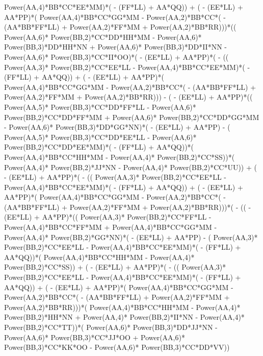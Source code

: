 \documentclass[10pt]{article} %
\begin{document}
Power(AA,4)*BB*CC*EE*MM)*( - (FF*LL) + AA*QQ)) + ( - (EE*LL) + AA*PP)*( Power(AA,4)*BB*CC*GG*MM -  Power(AA,2)*BB*CC*( - (AA*BB*FF*LL) +  Power(AA,2)*FF*MM +  Power(AA,2)*BB*RR)))*(( Power(AA,6)* Power(BB,2)*CC*DD*HH*MM -  Power(AA,6)* Power(BB,3)*DD*HH*NN +  Power(AA,6)* Power(BB,3)*DD*II*NN -  Power(AA,6)* Power(BB,3)*CC*II*OO)*( - (EE*LL) + AA*PP)*( - (( Power(AA,3)* Power(BB,2)*CC*EE*LL -  Power(AA,4)*BB*CC*EE*MM)*( - (FF*LL) + AA*QQ)) + ( - (EE*LL) + AA*PP)*( Power(AA,4)*BB*CC*GG*MM -  Power(AA,2)*BB*CC*( - (AA*BB*FF*LL) +  Power(AA,2)*FF*MM +  Power(AA,2)*BB*RR))) - ( - (EE*LL) + AA*PP)*(( Power(AA,5)* Power(BB,3)*CC*DD*FF*LL -  Power(AA,6)* Power(BB,2)*CC*DD*FF*MM +  Power(AA,6)* Power(BB,2)*CC*DD*GG*MM -  Power(AA,6)* Power(BB,3)*DD*GG*NN)*( - (EE*LL) + AA*PP) - ( Power(AA,5)* Power(BB,3)*CC*DD*EE*LL -  Power(AA,6)* Power(BB,2)*CC*DD*EE*MM)*( - (FF*LL) + AA*QQ))*( Power(AA,4)*BB*CC*HH*MM -  Power(AA,4)* Power(BB,2)*CC*SS))*( Power(AA,4)* Power(BB,2)*JJ*NN -  Power(AA,4)* Power(BB,2)*CC*UU)) + ( - (EE*LL) + AA*PP)*( - (( Power(AA,3)* Power(BB,2)*CC*EE*LL -  Power(AA,4)*BB*CC*EE*MM)*( - (FF*LL) + AA*QQ)) + ( - (EE*LL) + AA*PP)*( Power(AA,4)*BB*CC*GG*MM -  Power(AA,2)*BB*CC*( - (AA*BB*FF*LL) +  Power(AA,2)*FF*MM +  Power(AA,2)*BB*RR)))*( - (( - (EE*LL) + AA*PP)*(( Power(AA,3)* Power(BB,2)*CC*FF*LL -  Power(AA,4)*BB*CC*FF*MM +  Power(AA,4)*BB*CC*GG*MM -  Power(AA,4)* Power(BB,2)*GG*NN)*( - (EE*LL) + AA*PP) - ( Power(AA,3)* Power(BB,2)*CC*EE*LL -  Power(AA,4)*BB*CC*EE*MM)*( - (FF*LL) + AA*QQ))*( Power(AA,4)*BB*CC*HH*MM -  Power(AA,4)* Power(BB,2)*CC*SS)) + ( - (EE*LL) + AA*PP)*( - (( Power(AA,3)* Power(BB,2)*CC*EE*LL -  Power(AA,4)*BB*CC*EE*MM)*( - (FF*LL) + AA*QQ)) + ( - (EE*LL) + AA*PP)*( Power(AA,4)*BB*CC*GG*MM -  Power(AA,2)*BB*CC*( - (AA*BB*FF*LL) +  Power(AA,2)*FF*MM +  Power(AA,2)*BB*RR)))*( Power(AA,4)*BB*CC*HH*MM -  Power(AA,4)* Power(BB,2)*HH*NN +  Power(AA,4)* Power(BB,2)*II*NN -  Power(AA,4)* Power(BB,2)*CC*TT))*( Power(AA,6)* Power(BB,3)*DD*JJ*NN -  Power(AA,6)* Power(BB,3)*CC*JJ*OO +  Power(AA,6)* Power(BB,3)*CC*KK*OO -  Power(AA,6)* Power(BB,3)*CC*DD*VV))
\end{document}
